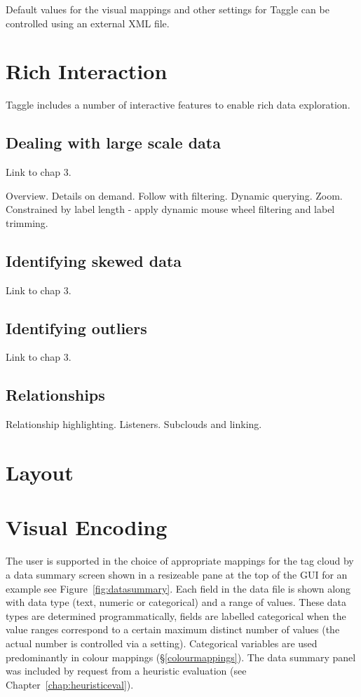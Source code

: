 Default values for the visual mappings and other settings for Taggle can be controlled using an external XML file.

 
\section{Rich Interaction}

Taggle includes a number of interactive features to enable rich data exploration. 

\subsection{Dealing with large scale data}

Link to chap 3.

Overview. Details on demand. Follow with filtering. Dynamic querying. Zoom.
Constrained by label length - apply dynamic mouse wheel filtering and label trimming.

\subsection{Identifying skewed data}

Link to chap 3.

\subsection{Identifying outliers}

Link to chap 3.

\subsection{Relationships}

Relationship highlighting. Listeners. Subclouds and linking.

\section{Layout}

\section{Visual Encoding}

The user is supported in the choice of appropriate mappings for the tag cloud by a data summary screen shown in a resizeable pane at the top of the GUI \textemdash for an example see Figure~\vref{fig:datasummary}. Each field in the data file is shown along with data type (text, numeric or categorical) and a range of values. These data types are determined programmatically, fields are labelled categorical when the value ranges correspond to a certain maximum distinct number of values (the actual number is controlled via a setting). Categorical variables are used predominantly in colour mappings (\S\vref{colourmappings}). The data summary panel was included by request from a heuristic evaluation (see Chapter~\vref{chap:heuristiceval}).

